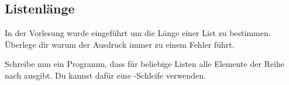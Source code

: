 \subsection{Listenlänge }

In der Vorlesung wurde  eingeführt um die Länge einer
List zu bestimmen. Überlege dir warum der Ausdruck 
immer zu einem Fehler führt.

Schreibe nun ein Programm, dass für beliebige Listen alle Elemente der Reihe
nach ausgibt. Du kannst dafür eine -Schleife verwenden.
